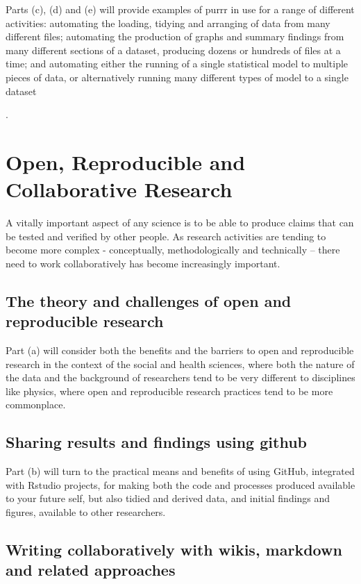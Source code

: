 \documentclass[]{book}
\theoremstyle{definition}
\theoremstyle{definition}
\theoremstyle{definition}
\theoremstyle{remark}
\begin{document}
Parts (c), (d) and (e) will provide examples of purrr in use for a range
of different activities: automating the loading, tidying and arranging
of data from many different files; automating the production of graphs
and summary findings from many different sections of a dataset,
producing dozens or hundreds of files at a time; and automating either
the running of a single statistical model to multiple pieces of data, or
alternatively running many different types of model to a single dataset

.

\chapter{Open, Reproducible and Collaborative
Research}\label{repro_research}

A vitally important aspect of any science is to be able to produce
claims that can be tested and verified by other people. As research
activities are tending to become more complex - conceptually,
methodologically and technically -- there need to work collaboratively
has become increasingly important.

\section{The theory and challenges of open and reproducible
research}\label{the-theory-and-challenges-of-open-and-reproducible-research}

Part (a) will consider both the benefits and the barriers to open and
reproducible research in the context of the social and health sciences,
where both the nature of the data and the background of researchers tend
to be very different to disciplines like physics, where open and
reproducible research practices tend to be more commonplace.

\section{Sharing results and findings using
github}\label{sharing-results-and-findings-using-github}

Part (b) will turn to the practical means and benefits of using GitHub,
integrated with Rstudio projects, for making both the code and processes
produced available to your future self, but also tidied and derived
data, and initial findings and figures, available to other researchers.

\section{Writing collaboratively with wikis, markdown and related
approaches}\label{writing-collaboratively-with-wikis-markdown-and-related-approaches}
\end{document}
